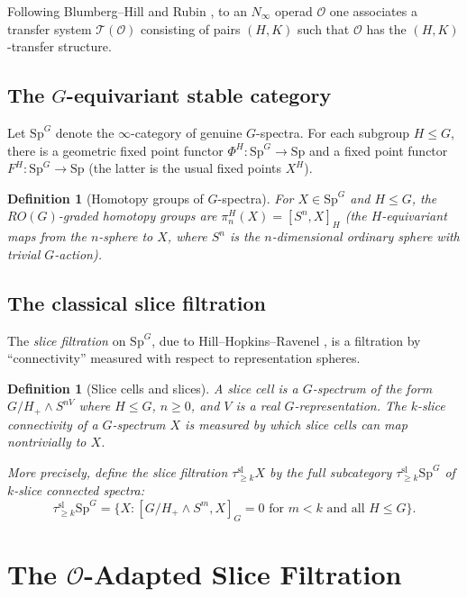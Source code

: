 \documentclass[12pt]{article}
\newtheorem{definition}[theorem]{Definition}
\begin{document}
Following Blumberg--Hill \cite{BH2015} and Rubin \cite{Rubin2021}, to an $N_\infty$ operad $\mathcal{O}$ one associates a transfer system $\mathcal{T}(\mathcal{O})$ consisting of pairs $(H, K)$ such that $\mathcal{O}$ has the $(H, K)$-transfer structure.

\subsection{The $G$-equivariant stable category}

Let $\mathrm{Sp}^G$ denote the $\infty$-category of genuine $G$-spectra. For each subgroup $H \leq G$, there is a geometric fixed point functor $\Phi^H: \mathrm{Sp}^G \to \mathrm{Sp}$ and a fixed point functor $F^H: \mathrm{Sp}^G \to \mathrm{Sp}$ (the latter is the usual fixed points $X^H$).

\begin{definition}[Homotopy groups of $G$-spectra]
For $X \in \mathrm{Sp}^G$ and $H \leq G$, the $RO(G)$-graded homotopy groups are $\pi_{n}^H(X) = [S^n, X]_H$ (the $H$-equivariant maps from the $n$-sphere to $X$, where $S^n$ is the $n$-dimensional ordinary sphere with trivial $G$-action).
\end{definition}

\subsection{The classical slice filtration}

The \emph{slice filtration} on $\mathrm{Sp}^G$, due to Hill--Hopkins--Ravenel \cite{HHR2016}, is a filtration by ``connectivity'' measured with respect to representation spheres.

\begin{definition}[Slice cells and slices]
A \emph{slice cell} is a $G$-spectrum of the form $G/H_+ \wedge S^{nV}$ where $H \leq G$, $n \geq 0$, and $V$ is a real $G$-representation. The \emph{$k$-slice connectivity} of a $G$-spectrum $X$ is measured by which slice cells can map nontrivially to $X$.

More precisely, define the slice filtration $\tau_{\geq k}^{\mathrm{sl}} X$ by the full subcategory $\tau_{\geq k}^{\mathrm{sl}} \mathrm{Sp}^G$ of $k$-slice connected spectra:
\[
\tau_{\geq k}^{\mathrm{sl}} \mathrm{Sp}^G = \{X : [G/H_+ \wedge S^m, X]_G = 0 \text{ for } m < k \text{ and all } H \leq G\}.
\]
\end{definition}

\section{The $\mathcal{O}$-Adapted Slice Filtration}
\end{document}
